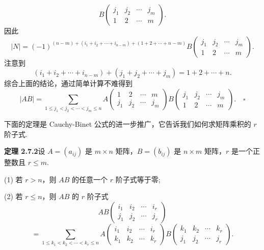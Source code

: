 \documentclass[UTF8, 12pt, fontset=fandol, oneside]{ctexart}
\begin{document}
\[
B\left(\begin{array}{cccc}
j_1 & j_2 & \cdots & j_m\\
1 & 2 & \cdots & m
\end{array}\right).
\]
因此
\[
|N|=(-1)^{(n-m)+(i_1+i_2+\cdots+i_{n-m})+(1+2+\cdots+n-m)}
B\left(\begin{array}{cccc}
j_1 & j_2 & \cdots & j_m\\
1 & 2 & \cdots & m
\end{array}\right).
\]
注意到
\[
(i_1+i_2+\cdots+i_{n-m})+(j_1+j_2+\cdots+j_m)=1+2+\cdots+n.
\]
综合上面的结论，通过简单计算不难得到
\[
|AB|=\sum_{1\leq j_1<j_2<\cdots<j_m\leq n}
A\left(\begin{array}{cccc}
1 & 2 & \cdots & m\\
j_1 & j_2 & \cdots & j_m
\end{array}\right)
B\left(\begin{array}{cccc}
j_1 & j_2 & \cdots & j_m\\
1 & 2 & \cdots & m
\end{array}\right). \quad \square
\]

下面的定理是 Cauchy-Binet 公式的进一步推广，它告诉我们如何求矩阵乘积的 $r$ 阶子式.

\noindent\textbf{定理 2.7.2}\quad 设 $A=(a_{ij})$ 是 $m\times n$ 矩阵，$B=(b_{ij})$ 是 $n\times m$ 矩阵，$r$ 是一个正整数且 $r\leq m$.

(1) 若 $r>n$，则 $AB$ 的任意一个 $r$ 阶子式等于零;

(2) 若 $r\leq n$，则 $AB$ 的 $r$ 阶子式
\[
AB\left(\begin{array}{cccc}
i_1 & i_2 & \cdots & i_r\\
j_1 & j_2 & \cdots & j_r
\end{array}\right)
\]
\[
=\sum_{1\leq k_1<k_2<\cdots<k_r\leq n}
A\left(\begin{array}{cccc}
i_1 & i_2 & \cdots & i_r\\
k_1 & k_2 & \cdots & k_r
\end{array}\right)
B\left(\begin{array}{cccc}
k_1 & k_2 & \cdots & k_r\\
j_1 & j_2 & \cdots & j_r
\end{array}\right).
\]
\end{document}
